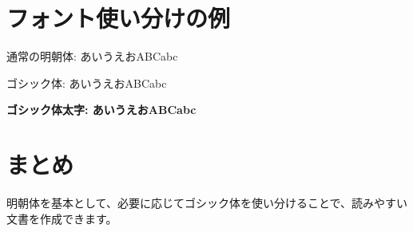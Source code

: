 \documentclass[12pt]{article}
\begin{document}
\section{フォント使い分けの例}

通常の明朝体: あいうえおABCabc

{\sffamily ゴシック体: あいうえおABCabc} %

{\sffamily\bfseries ゴシック体太字: あいうえおABCabc} %

\section{まとめ}

明朝体を基本として、必要に応じてゴシック体を使い分けることで、読みやすい文書を作成できます。
\end{document}
